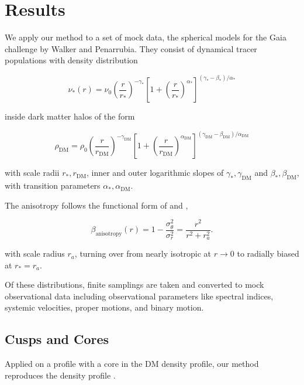 \section{Results}\label{sec:results}

We apply our method to a set of mock data, the spherical models
for the Gaia challenge by Walker and Penarrubia. They consist of
dynamical tracer populations with density distribution

\begin{equation}
\nu_*(r) = \nu_0\left(\frac{r}{r_*}\right)^{-\gamma_*} \left[1+\left(\frac{r}{r_*}\right)^{\alpha_*}\right]^{(\gamma_*-\beta_*)/\alpha_*}
\end{equation}

inside dark matter halos of the form

\begin{equation}
\rho_{\text{DM}} = \rho_0\left(\frac{r}{r_{\text{DM}}}\right)^{-\gamma_{\text{DM}}}\left[1+\left(\frac{r}{r_{\text{DM}}}\right)^{\alpha_{\text{DM}}}\right]^{(\gamma_{\text{DM}}-\beta_{\text{DM}})/\alpha_{\text{DM}}}
\end{equation}

with scale radii $r_*, r_\text{DM}$, inner and outer logarithmic
slopes of $\gamma_*, \gamma_{\text{DM}}$ and
$\beta_*,\beta_{\text{DM}}$, with transition parameters $\alpha_*,
\alpha_{\text{DM}}$.

The anisotropy follows the functional form of \citet{Osipkov1979} and
\citet{Merritt1985},

\begin{equation}
\beta_{\text{anisotropy}}(r)=1-\frac{\sigma_\theta^2}{\sigma_r^2} = \frac{r^2}{r^2+r_a^2}.
\end{equation}

with scale radius $r_a$, turning over from nearly isotropic at $r\to
0$ to radially biased at $r_*=r_a$.

Of these distributions, finite samplings are taken and converted to
mock observational data including observational parameters like
spectral indices, systemic velocities, proper motions, and binary
motion.


\subsection{Cusps and Cores}

Applied on a profile with a core in the DM density profile, our method
reproduces the density profile .

